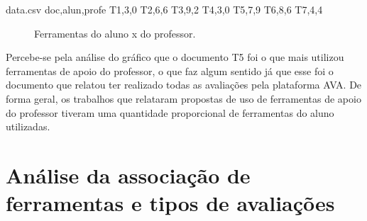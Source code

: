 \begin{filecontents}{data.csv}
doc,alun,profe
T1,3,0
T2,6,6
T3,9,2
T4,3,0
T5,7,9
T6,8,6
T7,4,4
\end{filecontents}
\datatable

\begin{figure}[ht!]
    \centering
    \label{fig:alun_profe}
    \caption{Ferramentas do aluno x do professor.}
\end{figure}

Percebe-se pela análise do gráfico que o documento T5 foi o que mais utilizou ferramentas de apoio do professor, o que faz algum sentido já que esse foi o documento que relatou ter realizado todas as avaliações pela plataforma AVA. De forma geral, os trabalhos que relataram propostas de uso de ferramentas de apoio do professor tiveram uma quantidade proporcional de ferramentas do aluno utilizadas.


\section{Análise da associação de ferramentas e tipos de avaliações}%

